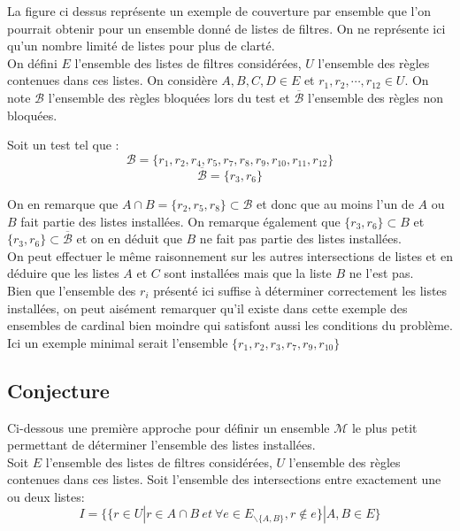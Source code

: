 \documentclass[oneside,a4paper,12pt]{article}
\begin{document}
La figure ci dessus représente un exemple de couverture par ensemble que l'on pourrait obtenir pour un ensemble donné de listes de filtres. On ne représente ici qu'un nombre limité de listes pour plus de clarté.\\

On défini $E$ l'ensemble des listes de filtres considérées, $U$ l'ensemble des règles contenues dans ces listes. On considère $A, B, C, D \in E$ et $r_1, r_2, \cdots, r_{12} \in U$. On note $\mathcal{B}$ l'ensemble des règles bloquées lors du test et $\overline{\mathcal{B}}$ l'ensemble des règles non bloquées.

Soit un test tel que :
\[ \mathcal{B} = \{r_1, r_2, r_4, r_5, r_7, r_8, r_9, r_{10}, r_{11}, r_{12}\} \]
\[ \overline{\mathcal{B}} = \{r_3, r_6\} \]

On en remarque que $A \cap B = \{r_2, r_5, r_8\} \subset \mathcal{B}$ et donc que au moins l'un de $A$ ou $B$ fait partie des listes installées. On remarque également que $\{r_3, r_6\} \subset B $ et $\{r_3, r_6\} \subset \overline{\mathcal{B}} $ et on en déduit que $B$ ne fait pas partie des listes installées.\\
\newpage
On peut effectuer le même raisonnement sur les autres intersections de listes et en déduire que les listes $A$ et $C$ sont installées mais que la liste $B$ ne l'est pas.\\

Bien que l'ensemble des $r_i$ présenté ici suffise à d\'eterminer correctement les listes installées, on peut aisément remarquer qu'il existe dans cette exemple des ensembles de cardinal bien moindre qui satisfont aussi les conditions du problème. Ici un exemple minimal serait l'ensemble $\{r_1, r_2, r_3, r_7, r_9, r_{10}\}$

\subsection{Conjecture}

Ci-dessous une première approche pour définir un ensemble $\mathcal{M}$ le plus petit permettant de déterminer l'ensemble des listes installées.\\

Soit $E$ l'ensemble des listes de filtres considérées, $U$ l'ensemble des règles contenues dans ces listes.
Soit l'ensemble des intersections entre exactement une ou deux listes:
\[I = \{\{r \in U | r \in A \cap B\ et\ \forall e \in E_{\backslash \{A, B\}}, r \notin e\} | A, B \in E\}\]
\end{document}
